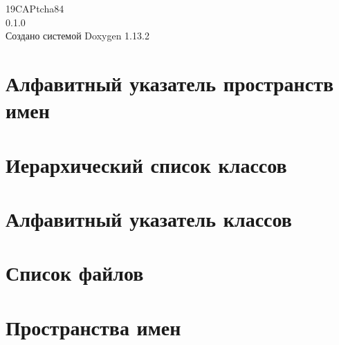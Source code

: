 \documentclass[twoside]{book}
\newcommand{\+}{\discretionary{\mbox{\scriptsize$\hookleftarrow$}}{}{}}
\newcommand{\clearemptydoublepage}{%
    \newpage{\pagestyle{empty}\cleardoublepage}%
  }
\begin{document}
  \raggedbottom
    \hypersetup{pageanchor=false,
                bookmarksnumbered=true,
                pdfencoding=unicode
               }
  \begin{titlepage}
  \vspace*{7cm}
  \begin{center}%
  {\Large 19\+CAPtcha84}\\
  [1ex]\large 0.\+1.\+0 \\
  \vspace*{1cm}
  {\large Создано системой Doxygen 1.13.2}\\
  \end{center}
  \end{titlepage}
  \clearemptydoublepage
  \tableofcontents
  \clearemptydoublepage
  \hypersetup{pageanchor=true}
\chapter{Алфавитный указатель пространств имен}

\chapter{Иерархический список классов}

\chapter{Алфавитный указатель классов}

\chapter{Список файлов}

\chapter{Пространства имен}






\end{document}
